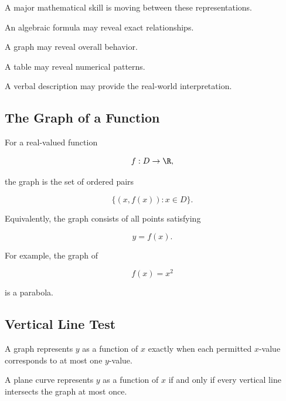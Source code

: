 A major mathematical skill is moving between these representations.

An algebraic formula may reveal exact relationships.

A graph may reveal overall behavior.

A table may reveal numerical patterns.

A verbal description may provide the real-world interpretation.

\subsection{The Graph of a Function}
\label{subsec:graph-of-function}

For a real-valued function

\[ f:D\to\R, \]

the graph is the set of ordered pairs

\[ \{(x,f(x)):x\in D\}. \]

Equivalently, the graph consists of all points satisfying

\[ y=f(x). \]

For example, the graph of

\[ f(x)=x^2 \]

is a parabola.

\begin{center}
\end{center}

\subsection{Vertical Line Test}
\label{subsec:vertical-line-test}

A graph represents \(y\) as a function of \(x\) exactly when each permitted
\(x\)-value corresponds to at most one \(y\)-value.

\begin{principle}
A plane curve represents \(y\) as a function of \(x\) if and only if every
vertical line intersects the graph at most once.
\end{principle}

